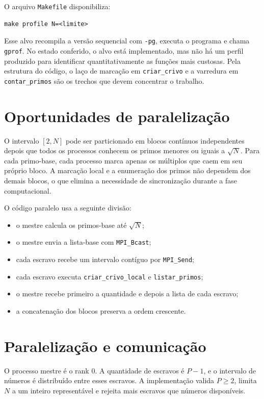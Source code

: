 \documentclass[12pt,a4paper]{article}
\begin{document}
O arquivo \texttt{Makefile} disponibiliza:

\begin{lstlisting}
make profile N=<limite>
\end{lstlisting}

Esse alvo recompila a versão sequencial com \texttt{-pg}, executa o programa e
chama \texttt{gprof}. No estado conferido, o alvo está implementado, mas não
há um perfil produzido para identificar quantitativamente as funções mais
custosas. Pela estrutura do código, o laço de marcação em
\texttt{criar\_crivo} e a varredura em \texttt{contar\_primos} são os trechos
que devem concentrar o trabalho.

\section{Oportunidades de paralelização}

O intervalo \([2,N]\) pode ser particionado em blocos contínuos independentes
depois que todos os processos conhecem os primos menores ou iguais a
\(\sqrt{N}\). Para cada primo-base, cada processo marca apenas os múltiplos
que caem em seu próprio bloco. A marcação local e a enumeração dos primos não
dependem dos demais blocos, o que elimina a necessidade de sincronização
durante a fase computacional.

O código paralelo usa a seguinte divisão:

\begin{itemize}
  \item o mestre calcula os primos-base até \(\sqrt{N}\);
  \item o mestre envia a lista-base com \texttt{MPI\_Bcast};
  \item cada escravo recebe um intervalo contíguo por \texttt{MPI\_Send};
  \item cada escravo executa \texttt{criar\_crivo\_local} e
        \texttt{listar\_primos};
  \item o mestre recebe primeiro a quantidade e depois a lista de cada
        escravo;
  \item a concatenação dos blocos preserva a ordem crescente.
\end{itemize}

\section{Paralelização e comunicação}

O processo mestre é o rank 0. A quantidade de escravos é \(P-1\), e o
intervalo de números é distribuído entre esses escravos. A implementação
valida \(P\geq2\), limita \(N\) a um inteiro representável e rejeita mais
escravos que números disponíveis.
\end{document}
